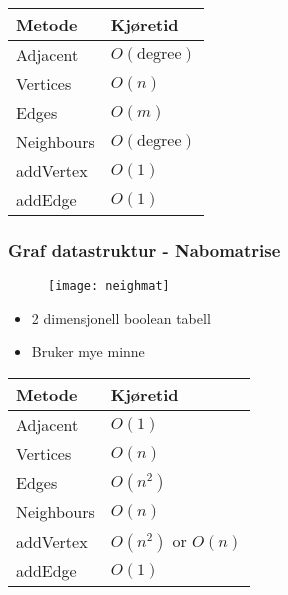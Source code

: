 \documentclass{article}
\begin{document}
    \begin{table}[H]
        \begin{center}
            \begin{tabular}[c]{|l|l|}
                \hline
                \textbf{Metode} & \textbf{Kjøretid} \\
                \hline
                 Adjacent& \( O\left( \text{degree}  \right) \)  \\
                 Vertices& \( O\left( n \right) \)  \\
                 Edges& \( O\left( m \right) \)  \\
                 Neighbours& \( O\left( \text{degree} \right) \)  \\
                 addVertex& \( O\left( 1 \right) \)  \\
                 addEdge& \( O\left( 1 \right) \)  \\
                \hline
            \end{tabular}
        \end{center}
    \end{table}

    \subsubsection{Graf datastruktur - Nabomatrise}

    \begin{figure}[H]
        \begin{center}
            \texttt{[image: neighmat]}
        \end{center}
    \end{figure}

    \begin{itemize}
        \item 2 dimensjonell boolean tabell
        \item Bruker mye minne
    \end{itemize}

    \begin{table}[H]
        \begin{center}
            \begin{tabular}[c]{|l|l|}
                \hline
                \textbf{Metode} & \textbf{Kjøretid} \\
                \hline
                 Adjacent& \( O\left(1\right) \)  \\
                 Vertices& \( O\left( n \right) \)  \\
                 Edges& \( O\left( n^2 \right) \)  \\
                 Neighbours& \( O\left(n \right) \)  \\
                 addVertex& \( O\left( n^2 \right) \) or \( O\left(n\right) \)  \\
                 addEdge& \( O\left( 1 \right) \)  \\
                \hline
            \end{tabular}
        \end{center}
    \end{table}
\end{document}
